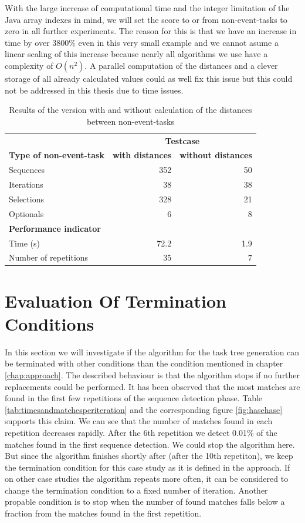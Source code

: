 With the large increase of computational time and the integer limitation of the Java array indexes in mind, we will set the score to or from non-event-tasks to zero in all further experiments.
The reason for this is that we have an increase in time by over 3800\% even in this very small example and we cannot asume a linear scaling of this increase because nearly all algorithms we use have a complexity of $O(n^2)$.
A parallel computation of the distances and a clever storage of all already calculated values could as well fix this issue but this could not be addressed in this thesis due to time issues.


\begin{table}[h]
	\centering
	\begin{tabular}{l r r}
		\toprule
		&  \multicolumn{2}{c}{\textbf{Testcase}} \\
		\cmidrule{2-3}
		\textbf{Type of non-event-task}& \textbf{with distances}& \textbf{without distances} \\
		\midrule
		Sequences & 352 & 50 \\
		Iterations& 38  & 38 \\
		Selections& 328 & 21 \\
		Optionals & 6   & 8  \\
		\midrule
		\textbf{Performance indicator} & \\
		\midrule
		Time (s)     & 72.2 & 1.9 \\
		Number of repetitions & 35 & 7\\
		\bottomrule
	\end{tabular}
	\caption{Results of the version with and without calculation of the distances between non-event-tasks}
	\label{tab:resultsnoneventtasks}
\end{table}

\section{Evaluation Of Termination Conditions}
In this section we will investigate if the algorithm for the task tree generation can be terminated with other conditions than the condition mentioned in chapter \ref{chap:approach}.
The described behaviour is that the algorithm stops if no further replacements could be performed.
It has been observed that the most matches are found in the first few repetitions of the sequence detection phase.
Table \ref{tab:timesandmatchesperiteration} and the corresponding figure \ref{fig:hasehase} supports this claim. We can see that the number of matches found in each repetition decreases rapidly.
After the 6th repetition we detect 0.01\% of the matches found in the first sequence detection. We could stop the algorithm here. But since the algorithm finishes shortly after (after the 10th repetiton),
we keep the termination condition for this case study as it is defined in the approach.
If on other case studies the algorithm repeats more often, it can be considered to change the termination condition to a fixed number of iteration.
Another propable condition is to stop when the number of found matches falls below a fraction from the matches found in the first repetition.

